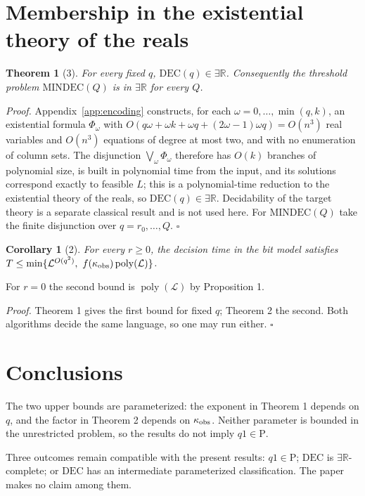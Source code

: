 \documentclass[journal]{IEEEtran}
\theoremstyle{plainn}
\newtheorem*{thm}{Theorem}
\newtheorem*{cor}{Corollary}
\begin{document}
\section{Membership in the existential theory of the reals}\label{sec:existsr}
\begin{thm}[3] For every fixed $q$, $\mathrm{DEC}(q)\in\exists\mathbb R$. Consequently the threshold problem $\mathrm{MINDEC}(Q)$ is in $\exists\mathbb R$ for every $Q$.

\end{thm}
\emph{Proof.} Appendix~\ref{app:encoding} constructs, for each
$\omega=0,\dots,\min(q,k)$, an existential formula $\Phi_\omega$ with
$O(q\omega+\omega k+\omega q+(2\omega-1)\omega q)=O(n^3)$ real variables and $O(n^3)$
equations of degree at most two, and with no enumeration of column sets. The disjunction
$\bigvee_\omega\Phi_\omega$ therefore has $O(k)$ branches of polynomial size, is built in
polynomial time from the input, and its solutions correspond exactly to feasible $L$; this
is a polynomial-time reduction to the existential theory of the reals, so
$\mathrm{DEC}(q)\in\exists\mathbb R$. Decidability of the target theory is a separate
classical result and is not used here. For $\mathrm{MINDEC}(Q)$ take the finite disjunction
over $q=r_0,\dots,Q$. $\square$

\begin{cor}[2] For every $r\ge0$, the decision time in the bit model satisfies $T\le\min\{\mathcal L^{O(q^2)},\ f(\kappa_{\rm obs})\operatorname{poly}(\mathcal L)\}$.
\end{cor}

For $r=0$ the second bound is $\operatorname{poly}(\mathcal L)$ by Proposition 1.

\emph{Proof.} Theorem 1 gives the first bound for fixed $q$; Theorem 2 the second. Both algorithms decide the same language, so one may run either. $\square$


\section{Conclusions}\label{sec:conclusions}
The two upper bounds are parameterized: the exponent in Theorem 1 depends on $q$, and the factor in Theorem 2 depends on $\kappa_{\rm obs}$. Neither parameter is bounded in the unrestricted problem, so the results do not imply $q1\in\mathrm P$.

Three outcomes remain compatible with the present results: $q1\in\mathrm P$; $\mathrm{DEC}$ is $\exists\mathbb R$-complete; or $\mathrm{DEC}$ has an intermediate parameterized classification. The paper makes no claim among them.
\end{document}
